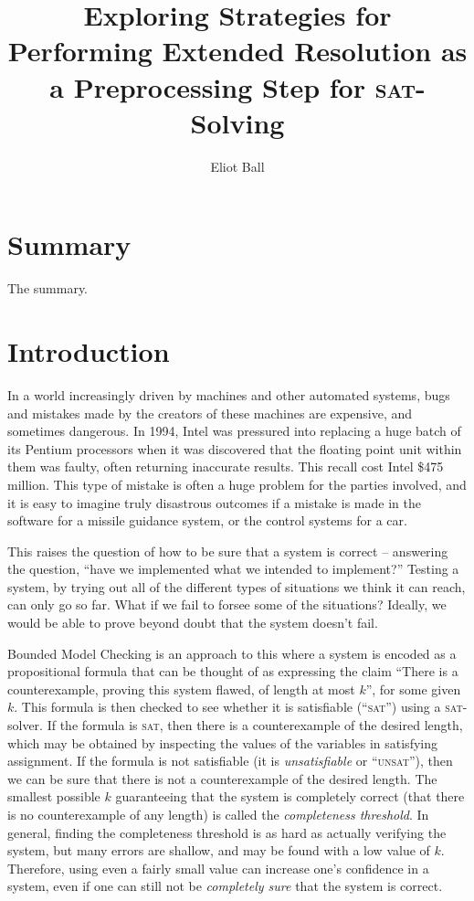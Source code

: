 \documentclass[11pt]{article}
\newcommand{\sat}{\textsc{sat}}
\newcommand{\unsat}{\textsc{unsat}}
\begin{document}
\title{Exploring Strategies for Performing Extended Resolution as a Preprocessing Step for \sat-Solving}
\author{Eliot Ball}

\maketitle

\section*{Summary}

The summary.

\tableofcontents

\section{Introduction}

In a world increasingly driven by machines and other automated systems, bugs and mistakes made by the creators of these machines are expensive, and sometimes dangerous. In 1994, Intel was pressured into replacing a huge batch of its Pentium processors when it was discovered that the floating point unit within them was faulty, often returning inaccurate results. This recall cost Intel \$475 million. This type of mistake is often a huge problem for the parties involved, and it is easy to imagine truly disastrous outcomes if a mistake is made in the software for a missile guidance system, or the control systems for a car.

This raises the question of how to be sure that a system is correct -- answering the question, ``have we implemented what we intended to implement?'' Testing a system, by trying out all of the different types of situations we think it can reach, can only go so far. What if we fail to forsee some of the situations? Ideally, we would be able to prove beyond doubt that the system doesn't fail.

Bounded Model Checking is an approach to this where a system is encoded as a propositional formula that can be thought of as expressing the claim ``There is a counterexample, proving this system flawed, of length at most $k$'', for some given $k$. This formula is then checked to see whether it is satisfiable (``\sat'') using a \sat{}-solver. If the formula is \sat, then there is a counterexample of the desired length, which may be obtained by inspecting the values of the variables in satisfying assignment. If the formula is not satisfiable (it is \emph{unsatisfiable} or ``\unsat''), then we can be sure that there is not a counterexample of the desired length. The smallest possible $k$ guaranteeing that the system is completely correct (that there is no counterexample of any length) is called the \emph{completeness threshold}. In general, finding the completeness threshold is as hard as actually verifying the system, but many errors are shallow, and may be found with a low value of $k$. Therefore, using even a fairly small value can increase one's confidence in a system, even if one can still not be \emph{completely sure} that the system is correct.
\end{document}
